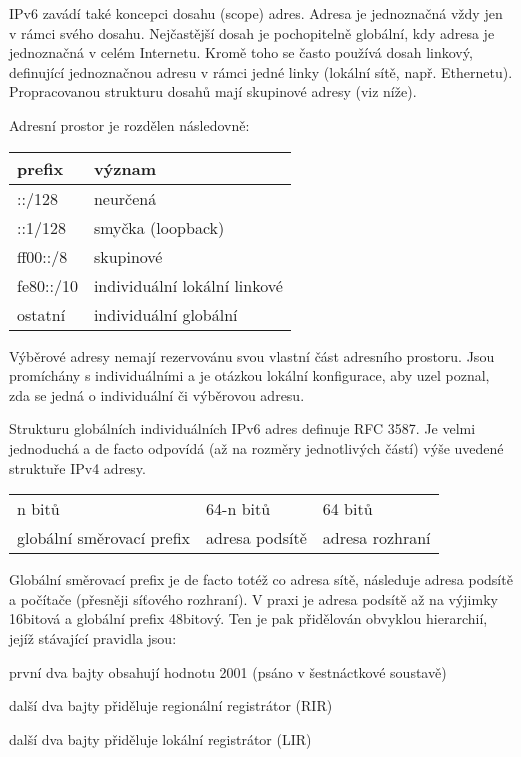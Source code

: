 IPv6 zavádí také koncepci dosahu (scope) adres. Adresa je jednoznačná vždy jen v rámci svého dosahu. Nejčastější dosah je pochopitelně globální, kdy adresa je jednoznačná v celém Internetu. Kromě toho se často používá dosah linkový, definující jednoznačnou adresu v rámci jedné linky (lokální sítě, např. Ethernetu). Propracovanou strukturu dosahů mají skupinové adresy (viz níže).

Adresní prostor je rozdělen následovně:
\begin{center}
\begin{tabular}{|l|l|}
	\hline
	prefix & význam \\
	\hline
	\hline
	::/128 & neurčená \\
	::1/128 & smyčka (loopback) \\
	ff00::/8 & skupinové \\
	fe80::/10 & individuální lokální linkové \\
	ostatní & individuální globální \\
	\hline
\end{tabular}
\end{center}

Výběrové adresy nemají rezervovánu svou vlastní část adresního prostoru. Jsou promíchány s individuálními a je otázkou lokální konfigurace, aby uzel poznal, zda se jedná o individuální či výběrovou adresu.

Strukturu globálních individuálních IPv6 adres definuje RFC 3587. Je velmi jednoduchá a de facto odpovídá (až na rozměry jednotlivých částí) výše uvedené struktuře IPv4 adresy.

\begin{center}
\begin{tabular}{|l|l|l|}
	\hline
	n bitů & 64-n bitů & 64 bitů \\
	globální směrovací prefix & adresa podsítě & adresa rozhraní \\
	\hline
\end{tabular}
\end{center}

Globální směrovací prefix je de facto totéž co adresa sítě, následuje adresa podsítě a počítače (přesněji síťového rozhraní). V praxi je adresa podsítě až na výjimky 16bitová a globální prefix 48bitový. Ten je pak přidělován obvyklou hierarchií, jejíž stávající pravidla jsou:
\begin{pitemize}
    \item první dva bajty obsahují hodnotu 2001 (psáno v šestnáctkové soustavě)
    \item další dva bajty přiděluje regionální registrátor (RIR)
    \item další dva bajty přiděluje lokální registrátor (LIR)
\end{pitemize}

